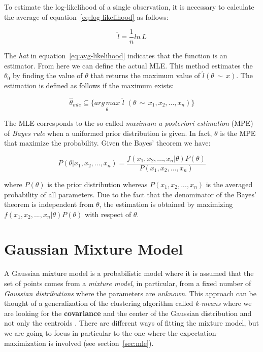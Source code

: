 \noindent To estimate the log-likelihood of a single observation, it is necessary to calculate the average of equation~\ref{eq:log-likelihood} as follows:

\begin{equation}
\label{eq:avg-likelihood}
	\hat{l} = \frac{1}{n} ln \, L
\end{equation}

\noindent The \textit{hat} in equation~\ref{eq:avg-likelihood} indicates that the function is an estimator. From here we can define the actual MLE.
This method estimates the $\theta_{0}$ by finding the value of $\theta$ that returns the maximum value of $\hat{l}(\theta \, \sim \, x)$. The estimation is defined as follows if the maximum exists:

\begin{equation}
	\hat{\theta}_{mle} \subseteq \{ \underset{\theta}{arg \, max} \,\, \hat{l} \,\, (\theta \, \sim \, x_{1}, x_{2}, ... , x_{n})\}
\end{equation}

\noindent The MLE corresponds to the so called \textit{maximum a posteriori estimation} (MPE) of \textit{Bayes rule} when a uniformed prior distribution is given. In fact, $\theta$ is the MPE that maximize the probability. Given the Bayes' theorem we have:

\begin{equation}
	P (\theta | x_{1}, x_{2}, ... , x_{n}) = \frac{f(x_{1}, x_{2}, ... , x_{n} | \theta) P(\theta)}{P(x_{1}, x_{2}, ... , x_{n})}
\end{equation}

\noindent where $P(\theta)$ is the prior distribution whereas $P(x_{1}, x_{2}, ... , x_{n})$ is the averaged probability of all parameters. Due to the fact that the denominator of the Bayes' theorem is independent from $\theta$, the estimation is obtained by maximizing $f(x_{1}, x_{2}, ... , x_{n} | \theta) P(\theta)$ with respect of $\theta$.


\section{Gaussian Mixture Model}
A Gaussian mixture model is a probabilistic model where it is assumed that the set of points comes from a \textit{mixture model}, in particular, from a fixed number of \textit{Gaussian distributions} where the parameters are \textit{unknown}. This approach can be thought of a generalization of the clustering algorithm called \textit{k-means} where we are looking for the \textbf{covariance} and the center of the Gaussian distribution and not only the centroids \cite{sklearn_gmm}. There are different ways of fitting the mixture model, but we are going to focus in particular to the one where the expectation-maximization is involved (see section~\ref{sec:mle}). \\

